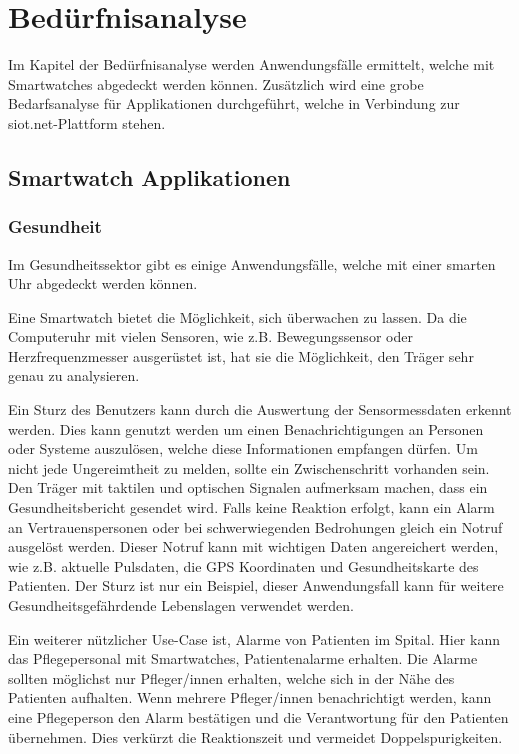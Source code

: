 \chapter{Bedürfnisanalyse}
Im Kapitel der Bedürfnisanalyse werden Anwendungsfälle ermittelt, welche mit Smartwatches abgedeckt werden können. Zusätzlich wird eine grobe Bedarfsanalyse für Applikationen durchgeführt, welche in Verbindung zur siot.net-Plattform stehen.

\section{Smartwatch Applikationen}
\subsection{Gesundheit}
Im Gesundheitssektor gibt es einige Anwendungsfälle, welche mit einer smarten Uhr abgedeckt werden können.

Eine Smartwatch bietet die Möglichkeit, sich überwachen zu lassen. Da die Computeruhr mit vielen Sensoren, wie z.B. Bewegungssensor oder Herzfrequenzmesser ausgerüstet ist, hat sie die Möglichkeit, den Träger sehr genau zu analysieren.

Ein Sturz des Benutzers kann durch die Auswertung der Sensormessdaten erkennt werden. Dies kann genutzt werden um einen Benachrichtigungen an Personen oder Systeme auszulösen, welche diese Informationen empfangen dürfen. Um nicht jede Ungereimtheit zu melden, sollte ein Zwischenschritt vorhanden sein. Den Träger mit taktilen und optischen Signalen aufmerksam machen, dass ein Gesundheitsbericht gesendet wird. Falls keine Reaktion erfolgt, kann ein Alarm an Vertrauenspersonen oder bei schwerwiegenden Bedrohungen gleich ein Notruf ausgelöst werden. Dieser Notruf kann mit wichtigen Daten angereichert werden, wie z.B. aktuelle Pulsdaten, die \gls{GPS} Koordinaten und Gesundheitskarte des Patienten. Der Sturz ist nur ein Beispiel, dieser Anwendungsfall kann für weitere Gesundheitsgefährdende Lebenslagen verwendet werden.

Ein weiterer nützlicher Use-Case ist, Alarme von Patienten im Spital. Hier kann das Pflegepersonal mit Smartwatches, Patientenalarme erhalten. Die Alarme sollten möglichst nur Pfleger/innen erhalten, welche sich in der Nähe des Patienten aufhalten. Wenn mehrere Pfleger/innen benachrichtigt werden, kann eine Pflegeperson den Alarm bestätigen und die Verantwortung für den Patienten übernehmen. Dies verkürzt die Reaktionszeit und vermeidet Doppelspurigkeiten.

